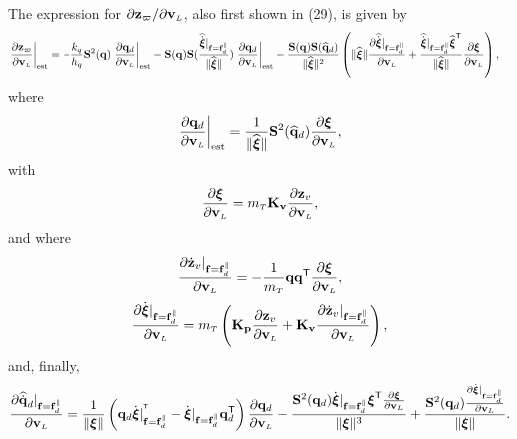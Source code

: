 \documentclass[journal,onecolumn]{IEEEtran}
\newcommand{\minus}{\scalebox{0.75}[1.0]{$-$}}
\begin{document}
	The expression for $\partial\zc/\partial\vL$, also first shown in (29), is given by
    \begin{align}
        \left.\frac{\partial\zc}{\partial\vL}\right|_{\text{est}} =&~ \minus \frac{k_q}{h_{q}}\Skew[2]{\dir}\left.\frac{\partial\dird}{\partial\vL}\right|_{\text{est}} -
        \Skew{\dir}\Skew{\frac{\widehat{\dot{\Xiq}}|_{\f=\f_d^{\|}}}{\|\widehat{\Xiq}\|}} \left.\frac{\partial\dird}{\partial\vL}\right|_{\text{est}}
        -\frac{\Skew{\dir}\Skew{\qdhat}}{\|\widehat{\Xiq}\|^2}\left(\|\widehat{\Xiq}\|\frac{\partial\widehat{\dot{\Xiq}}|_{\f=\fd^{\|}}}{\partial\vL} + \frac{\widehat{\dot{\Xiq}}|_{\f=\f_d^{\|}}\widehat{\Xiq}\trs}{\|\widehat{\Xiq}\|}\frac{\partial\Xiq}{\partial\vL}\right),
        \label{eq:partial_zw_vL}
	\end{align}
	where
	\begin{equation}
		\left.\frac{\partial\dird}{\partial\vL}\right|_{\text{est}} = \frac{1}{\|\widehat{\Xiq}\|}\Skew[2]{\qdhat}\frac{\partial\Xiq}{\partial\vL},
	\end{equation}
	with
	\begin{equation}
		\frac{\partial\Xiq}{\partial\vL} = \mT\v{K}_\v{v}\frac{\partial\zv}{\partial\vL},
	\end{equation}
	and where
	\begin{equation}
		\frac{\partial\zvdot|_{\f=\fd^{\|}}}{\partial\vL}=-\frac{1}{\mT}\dir\dir[T]\frac{\partial\Xiq}{\partial\vL},
	\end{equation}
	\begin{equation}
		\frac{\partial\dot{\Xiq}|_{\f=\fd^{\|}}}{\partial\vL}=\mT\LP{\bf K_p} \frac{\partial\zv}{\partial\vL} + {\bf K_v} \frac{\partial\zvdot|_{\f=\fd^{\|}}}{\partial\vL}\RP,
	\end{equation}
	and, finally,
	\begin{equation}
		\frac{\partial\qddothat|_{\f=\fd^{\|}}}{\partial\vL} = \frac{1}{\|\Xiq\|}\LP\dird\dot{\Xiq}|_{\f=\fd^{\|}}^{\trs}-\dot{\Xiq}|_{\f=\fd^{\|}}\dird[T]\RP\frac{\partial\dird}{\partial\vL}
		-\frac{\Skew[2]{\dird}\dot{\Xiq}|_{\f=\fd^{\|}}\Xiq[T]\frac{\partial\Xiq}{\partial\vL}}{\|\Xiq\|^3} +\frac{\Skew[2]{\dird} \frac{\partial\dot{\Xiq}|_{\f=\fd^{\|}}}{\partial\vL}}{\|\Xiq\|}.
		\label{eq:partial_qd_vL}
	\end{equation}
\end{document}
